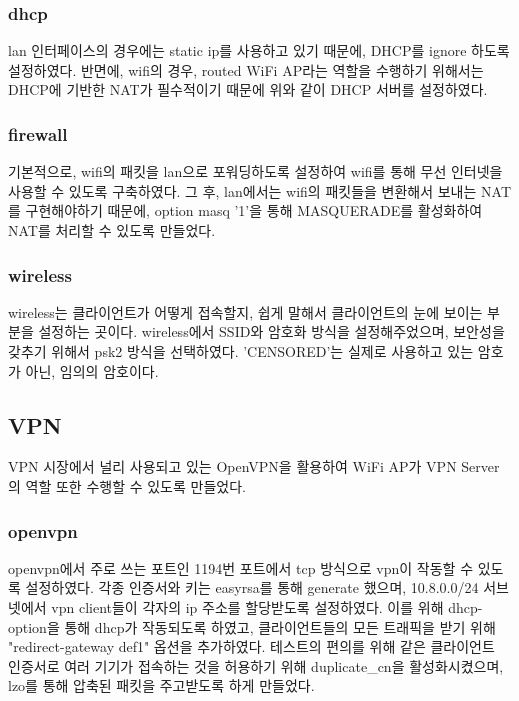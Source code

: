 \documentclass{article}
\begin{document}
    \subsubsection{dhcp}
    lan 인터페이스의 경우에는 static ip를 사용하고 있기 때문에, DHCP를 ignore 하도록 설정하였다.
    반면에, wifi의 경우, routed WiFi AP라는 역할을 수행하기 위해서는 DHCP에 기반한 NAT가 필수적이기 때문에 위와 같이 DHCP 서버를 설정하였다.

    \subsubsection{firewall}
    기본적으로, wifi의 패킷을 lan으로 포워딩하도록 설정하여 wifi를 통해 무선 인터넷을 사용할 수 있도록 구축하였다.
    그 후, lan에서는 wifi의 패킷들을 변환해서 보내는 NAT를 구현해야하기 때문에,
    option masq '1'을 통해 MASQUERADE를 활성화하여 NAT를 처리할 수 있도록 만들었다.

    \subsubsection{wireless}
    wireless는 클라이언트가 어떻게 접속할지, 쉽게 말해서 클라이언트의 눈에 보이는 부분을 설정하는 곳이다.
    wireless에서 SSID와 암호화 방식을 설정해주었으며, 보안성을 갖추기 위해서 psk2 방식을 선택하였다.
    'CENSORED'는 실제로 사용하고 있는 암호가 아닌, 임의의 암호이다.


    \subsection{VPN}
    VPN 시장에서 널리 사용되고 있는 OpenVPN을 활용하여 WiFi AP가 VPN Server의 역할 또한 수행할 수 있도록 만들었다.
    \subsubsection{openvpn}
    openvpn에서 주로 쓰는 포트인 1194번 포트에서 tcp 방식으로 vpn이 작동할 수 있도록 설정하였다.
    각종 인증서와 키는 easyrsa를 통해 generate 했으며, 10.8.0.0/24 서브넷에서 vpn client들이 각자의 ip 주소를 할당받도록 설정하였다.
    이를 위해 dhcp-option을 통해 dhcp가 작동되도록 하였고, 클라이언트들의 모든 트래픽을 받기 위해 "redirect-gateway def1" 옵션을 추가하였다.
    테스트의 편의를 위해 같은 클라이언트 인증서로 여러 기기가 접속하는 것을 허용하기 위해 duplicate\_cn을 활성화시켰으며, lzo를 통해 압축된 패킷을 주고받도록 하게 만들었다.
\end{document}
